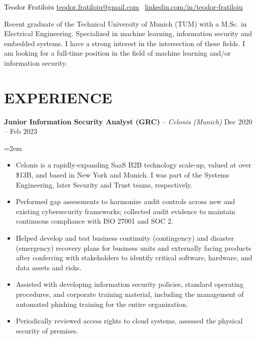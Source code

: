 \documentclass[paper=a4,fontsize=11pt]{scrartcl}
\newcommand{\sepspace}{\vspace*{0.35em}}		%
\newcommand{\NewPart}[1]{\section*{\uppercase{#1}}}
\newcommand{\EducationEntry}[4]{
		\noindent \textit{#1} \hfill      %
		\colorbox{custom_gray}{\color{white}#2} \par  %
		\noindent\hangindent=2em\hangafter=0 \small #3 %
		\normalsize \par}
\newcommand{\WorkEntry}[4]{				  %
		\noindent \textbf{#1} – \textit{#3} \hfill      %
		\colorbox{custom_gray}{\color{white}#2} \par  %
		\noindent\hangindent=2em\hangafter=0 \small #4 %
		\normalsize \par}
\begin{document}
\begin{adjustwidth}{-0.9in}{}
     	\textcolor{black}{
	\parbox[b][2.5cm][c]{21cm}{%
            \huge 
            \centering
            \vspace*{1.5cm}
            \hspace*{3.5cm}Teodor Fratiloiu
            \large
            \newline
            \href{mailto:teodor.fratiloiu@gmail.com}{teodor.fratiloiu@gmail.com} \textbar\
            \href{https://www.linkedin.com/in/teodor-fratiloiu/}{linkedin.com/in/teodor-fratiloiu}
        }
}

\end{adjustwidth}
\vspace{-0.3cm}
Recent graduate of the Technical University of Munich (TUM) with a M.Sc. in Electrical Engineering. Specialized in machine learning, information security and embedded systems. I have a strong interest in the intersection of these fields. I am looking for a full-time position in the field of machine learning and/or information security.
\vspace{-0.5cm}
\NewPart{Experience}{}
\vspace{-0.3cm}
\WorkEntry{Junior Information Security Analyst (GRC)}{Dec 2020 – Feb 2023}{Celonis (Munich)}
{
\begin{itemize}
  \item Celonis is a rapidly-expanding SaaS B2B technology scale-up, valued at over \$13B, and based in New York and Munich. I was part of the Systems Engineering, later Security and Trust teams, respectively.
  \item Performed gap assessments to harmonize audit controls across new and existing cybersecurity frameworks; collected audit evidence to maintain continuous compliance with ISO 27001 and SOC 2.
  \item Helped develop and test business continuity (contingency) and disaster (emergency) recovery plans for business units and externally facing products after conferring with stakeholders to identify critical software, hardware, and data assets and risks.
  \item Assisted with developing information security policies, standard operating procedures, and corporate training material, including the management of automated phishing training for the entire organization.
  \item Periodically reviewed access rights to cloud systems, assessed the physical security of premises.
\end{itemize}
}
\end{document}
